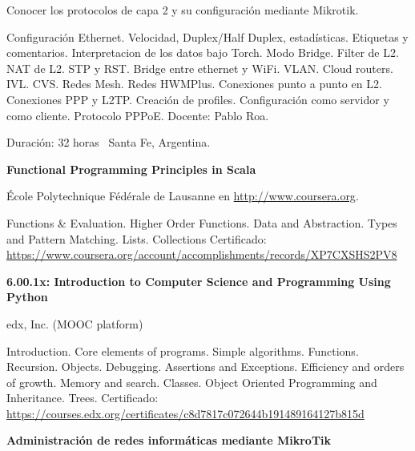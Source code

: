 \documentclass[letterpaper,MMMyyyy,nonstop]{simpleresumecv}
\begin{document}
\begin{body}
\BulletItem Conocer los protocolos de capa 2 y su configuración mediante Mikrotik.

\begin{detail}
	\SubBulletItem 
	Configuración Ethernet. Velocidad, Duplex/Half Duplex, estadísticas. Etiquetas y comentarios. Interpretacion de los datos bajo Torch. Modo Bridge.  Filter de L2. NAT de L2. STP y RST. Bridge entre ethernet y WiFi. VLAN. Cloud routers. IVL. CVS. Redes Mesh. Redes HWMPlus. Conexiones punto a punto en L2. Conexiones  PPP y L2TP.  Creación de profiles.  Configuración como servidor y como cliente. Protocolo PPPoE.
	\SubBulletItem Docente: Pablo Roa.
\end{detail}
Duración: 32 horas \SubBulletSymbol\, Santa Fe, Argentina.

\BigGap
\textbf{Functional Programming Principles in Scala}
\hfill
{}

\BulletItem École Polytechnique Fédérale de Lausanne en \href{coursera.org}{http://www.coursera.org}.
\begin{detail}
	\SubBulletItem
	Functions \& Evaluation. Higher Order Functions. Data and Abstraction. Types and Pattern Matching. Lists. Collections
	\SubBulletItem
	Certificado: \href{https://www.coursera.org/account/accomplishments/records/XP7CXSHS2PV8}
	{https://www.coursera.org/account/accomplishments/records/XP7CXSHS2PV8}
	
\end{detail}


\BigGap
\textbf{6.00.1x: Introduction to Computer Science and Programming Using Python }
\hfill
{}

\BulletItem  edx, Inc. (MOOC platform)
\begin{detail}
	\SubBulletItem
	Introduction. Core elements of programs. Simple algorithms. Functions. Recursion. Objects. Debugging. Assertions and Exceptions. Efficiency and orders of growth. Memory and search. Classes. Object Oriented Programming	and Inheritance. Trees.
	\SubBulletItem
	Certificado: \href{https://courses.edx.org/certificates/c8d7817c072644b191489164127b815d}
	{https://courses.edx.org/certificates/c8d7817c072644b191489164127b815d}
	
\end{detail}


\BigGap
\textbf{Administración de redes informáticas mediante MikroTik}
\hfill
{}


\end{body}
\end{document}

